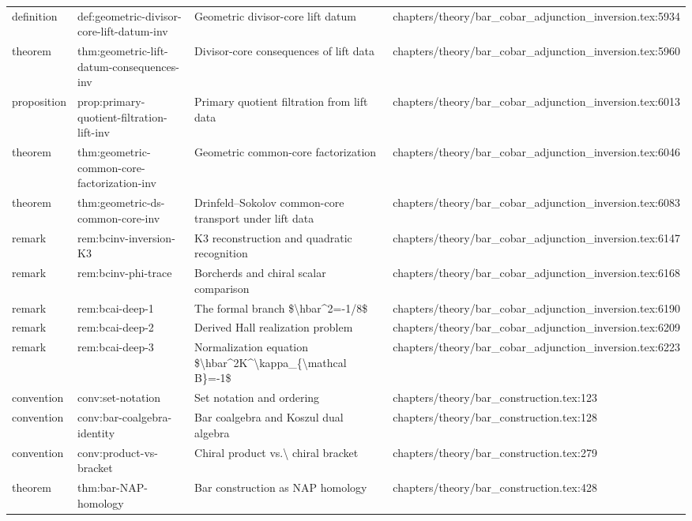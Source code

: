 \documentclass[11pt]{article}
\begin{document}
\begin{longtable}{L{0.10\textwidth}L{0.26\textwidth}L{0.42\textwidth}L{0.22\textwidth}}
definition & def:geometric-divisor-core-lift-datum-inv & Geometric divisor-core lift datum & chapters/theory/bar\_cobar\_adjunction\_inversion.tex:5934\\
theorem & thm:geometric-lift-datum-consequences-inv & Divisor-core consequences of lift data & chapters/theory/bar\_cobar\_adjunction\_inversion.tex:5960\\
proposition & prop:primary-quotient-filtration-lift-inv & Primary quotient filtration from lift data & chapters/theory/bar\_cobar\_adjunction\_inversion.tex:6013\\
theorem & thm:geometric-common-core-factorization-inv & Geometric common-core factorization & chapters/theory/bar\_cobar\_adjunction\_inversion.tex:6046\\
theorem & thm:geometric-ds-common-core-inv & Drinfeld--Sokolov common-core transport under lift data & chapters/theory/bar\_cobar\_adjunction\_inversion.tex:6083\\
remark & rem:bcinv-inversion-K3 & K3 reconstruction and quadratic recognition & chapters/theory/bar\_cobar\_adjunction\_inversion.tex:6147\\
remark & rem:bcinv-phi-trace & Borcherds and chiral scalar comparison & chapters/theory/bar\_cobar\_adjunction\_inversion.tex:6168\\
remark & rem:bcai-deep-1 & The formal branch \$\textbackslash{}hbar\textasciicircum{}2=-1/8\$ & chapters/theory/bar\_cobar\_adjunction\_inversion.tex:6190\\
remark & rem:bcai-deep-2 & Derived Hall realization problem & chapters/theory/bar\_cobar\_adjunction\_inversion.tex:6209\\
remark & rem:bcai-deep-3 & Normalization equation \$\textbackslash{}hbar\textasciicircum{}2K\textasciicircum{}\textbackslash{}kappa\_\{\textbackslash{}mathcal B\}=-1\$ & chapters/theory/bar\_cobar\_adjunction\_inversion.tex:6223\\
convention & conv:set-notation & Set notation and ordering & chapters/theory/bar\_construction.tex:123\\
convention & conv:bar-coalgebra-identity & Bar coalgebra and Koszul dual algebra & chapters/theory/bar\_construction.tex:128\\
convention & conv:product-vs-bracket & Chiral product vs.\textbackslash{} chiral bracket & chapters/theory/bar\_construction.tex:279\\
theorem & thm:bar-NAP-homology & Bar construction as NAP homology & chapters/theory/bar\_construction.tex:428\\

\end{longtable}
\end{document}
